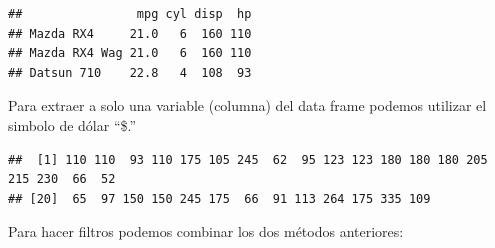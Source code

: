 \documentclass[
  12pt,
]{book}
\newenvironment{Shaded}{\begin{snugshade}}{\end{snugshade}}
\newcommand{\DecValTok}[1]{\textcolor[rgb]{0.00,0.00,0.81}{#1}}
\newcommand{\NormalTok}[1]{#1}
\newcommand{\SpecialCharTok}[1]{\textcolor[rgb]{0.00,0.00,0.00}{#1}}
\begin{document}
\begin{verbatim}
##                mpg cyl disp  hp
## Mazda RX4     21.0   6  160 110
## Mazda RX4 Wag 21.0   6  160 110
## Datsun 710    22.8   4  108  93
\end{verbatim}

Para extraer a solo una variable (columna) del data frame podemos utilizar el simbolo de dólar ``\$.''

\begin{Shaded}
\end{Shaded}

\begin{verbatim}
##  [1] 110 110  93 110 175 105 245  62  95 123 123 180 180 180 205 215 230  66  52
## [20]  65  97 150 150 245 175  66  91 113 264 175 335 109
\end{verbatim}

Para hacer filtros podemos combinar los dos métodos anteriores:

\begin{Shaded}
\end{Shaded}
\end{document}
